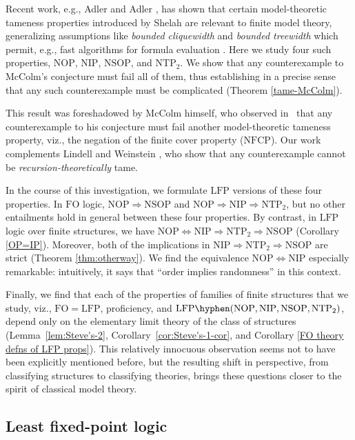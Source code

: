 \documentclass{lmcs}
\newcommand{\LFP}{\mathrm{LFP}}
\newcommand{\FO}{\mathrm{FO}}
\newcommand{\NOP}{\mathrm{NOP}}
\newcommand{\NIP}{\mathrm{NIP}}
\newcommand{\NSOP}{\mathrm{NSOP}}
\newcommand{\NTPT}{\mathrm{NTP}_2}
\theoremstyle{thmC}
\begin{document}
Recent work, e.g., Adler and Adler \cite{AA}, has shown that certain model-theoretic tameness properties introduced by Shelah \cite{S} are relevant to finite model theory, generalizing assumptions like \emph{bounded cliquewidth} and \emph{bounded treewidth} which permit, e.g., fast algorithms for formula evaluation \cite{Cour}. Here we study four such properties, $\NOP$, $\NIP$, $\NSOP$, and $\NTPT$. We show that any counterexample to McColm's conjecture must fail all of them, thus establishing in a precise sense that any such counterexample must be complicated (Theorem \ref{tame-McColm}).

This result was foreshadowed by McColm himself, who observed in~\cite{McC} that any counterexample to his conjecture must fail another model-theoretic tameness property, viz., the negation of the finite cover property ($\mathrm{NFCP}$). Our work complements Lindell and Weinstein \cite{LW00}, who show that any counterexample cannot be \emph{recursion-theoretically} tame.

In the course of this investigation, we formulate $\LFP$ versions of these four properties. In $\FO$ logic, $\NOP\Rightarrow\NSOP$ and $\NOP\Rightarrow\NIP\Rightarrow\NTPT$, but no other entailments hold in general between these four properties. By contrast, in $\LFP$ logic over finite structures, we have $\NOP\Leftrightarrow\NIP\Rightarrow\NTPT\Rightarrow\NSOP$ (Corollary \ref{OP=IP}). Moreover, both of the implications in $\NIP\Rightarrow\NTPT\Rightarrow\NSOP$ are strict (Theorem \ref{thm:otherway}). We find the equivalence $\NOP\Leftrightarrow\NIP$ especially remarkable: intuitively, it says that ``order implies randomness'' in this context.

Finally, we find that each of the properties of families of finite structures that we study, viz., $\FO = \LFP$, proficiency, and $\LFP\hyphen(\NOP, \NIP, \NSOP, \NTPT)$, depend only on the elementary limit theory of the class of structures (Lemma~\ref{lem:Steve's-2}, Corollary~\ref{cor:Steve's-1-cor}, and Corollary \ref{FO theory defns of LFP props}). This relatively innocuous observation seems not to have been explicitly mentioned before, but the resulting shift in perspective, from classifying structures to classifying theories, brings these questions closer to the spirit of classical model theory.


\subsection{Least fixed-point logic}
\end{document}
